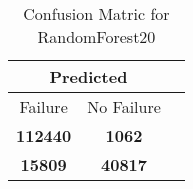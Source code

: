 \begin{table}[] 
\caption{Confusion Matric for RandomForest20} 
\label{Table: Prediction Accuracy-DMDRandomForest20OnlySunEKF-combinationReflectionEKF-top2perfectNoFailurePrediction-Reflection} 
\centering 
\begin{tabular} 
 {@{}ccc@{}} 
\toprule 
\multicolumn{2}{c}{\textbf{Predicted}}
 \\ \midrule 
\multicolumn{1}{|c|}{Failure} & 
\multicolumn{1}{c|}{No Failure}
 \\ \midrule 
\multicolumn{1}{|c|}{\color{green}\textbf{112440}} & 
\multicolumn{1}{c|}{\color{red}\textbf{1062}}
 \\ \midrule 
\multicolumn{1}{|c|}{\color{red}\textbf{15809}} & 
\multicolumn{1}{c|}{\color{green}\textbf{40817}}
 \\ \bottomrule 
\end{tabular} 
\end{table} 
